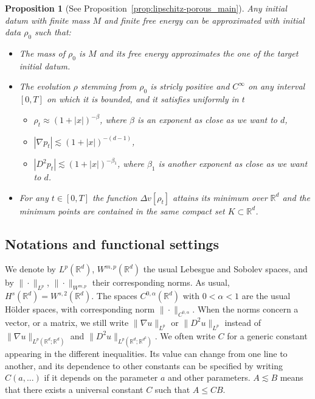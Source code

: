 \documentclass[11pt,a4paper]{article}
\numberwithin{equation}{section}
\newcommand{\R}{{\mathbb{R}}}
\theoremstyle{plain}
\newtheorem{proposition}[theorem]{Proposition}
\theoremstyle{remark}
\begin{document}
\begin{proposition}[See Proposition~\ref{prop:lipschitz-porous_main}]
    Any initial datum with finite mass $M$ and finite free energy can be approximated with initial data $\rho_0$ such that:
    \begin{itemize}
        \item The mass of $\rho_0$ is $M$ and its free energy approximates the one of the target initial datum.
        \item The evolution $\rho$ stemming from $\rho_0$ is stricly positive and $C^\infty$ on any interval $[0,T]$ on which it is bounded, and it satisfies uniformly in $t$
        \begin{itemize}
            \item $\rho_t\approx (1+|x|)^{-\beta}$, where $\beta$ is an exponent as close as we want to $d$,
            \item $|\nabla p_t|\lesssim (1+|x|)^{-(d-1)}$,
            \item $|D^2 p_t|\lesssim (1+|x|)^{-\beta_1}$, where $\beta_1$ is another exponent as close as we want to $d$.
             \end{itemize}
    \item For any $t\in [0,T]$ the function $\Delta v[\rho_t]$ attains its minimum over $\R^d$ and the minimum points are contained in the same compact set $K\subset\R^d$.
    \end{itemize}
\end{proposition}


\fi


\subsection{Notations and functional settings}

We denote by $L^{p}(\R^d)$, $W^{m,p}(\R^d)$ the usual Lebesgue and Sobolev spaces, and by $\|\cdot\|_{L^{p}}$, $\|\cdot\|_{W^{m,p}}$ their corresponding norms. As usual, $H^{s}(\R^d) = W^{s,2}(\R^d)$. The spaces $C^{0,\alpha}(\R^d)$ with $0<\alpha<1$ are the usual H\"older spaces, with corresponding norm $\|\cdot\|_{C^{0,\alpha}}$. When the norms concern a vector, or a matrix, we still write $\|\nabla u\|_{L^{p}}$ or $\|D^{2} u\|_{L^{p}}$ instead of $\|\nabla u\|_{L^{p}(\R^d; \R^d)}$ and $\|D^2 u\|_{L^{p}(\R^d;\R^{d^2})}$. We often write $C$ for a generic constant appearing in the different inequalities. Its value can change from one line to another, and its dependence to other constants can be specified by writing $C(a,...)$ if it depends on the parameter $a$ and other parameters. $A\lesssim B$ means that there exists a universal constant $C$ such that $A\le C B$. 
\end{document}
